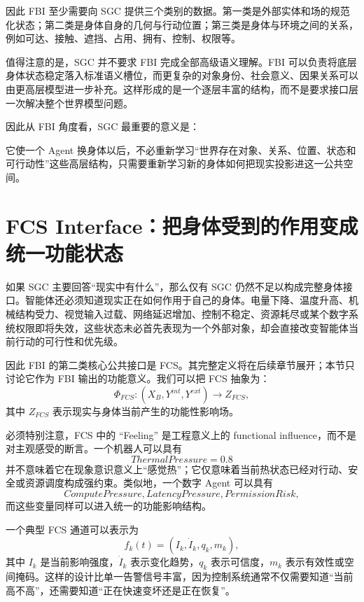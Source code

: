 因此 FBI 至少需要向 SGC 提供三个类别的数据。第一类是外部实体和场的规范化状态；第二类是身体自身的几何与行动位置；第三类是身体与环境之间的关系，例如可达、接触、遮挡、占用、拥有、控制、权限等。

值得注意的是，SGC 并不要求 FBI 完成全部高级语义理解。FBI 可以负责将底层身体状态稳定落入标准语义槽位，而更复杂的对象身份、社会意义、因果关系可以由更高层模型进一步补充。这样形成的是一个逐层丰富的结构，而不是要求接口层一次解决整个世界模型问题。

因此从 FBI 角度看，SGC 最重要的意义是：
\begin{statementbox}
\centering
{}
\end{statementbox}
它使一个 Agent 换身体以后，不必重新学习“世界存在对象、关系、位置、状态和可行动性”这些高层结构，只需要重新学习新的身体如何把现实投影进这一公共空间。


\section{FCS Interface：把身体受到的作用变成统一功能状态}

如果 SGC 主要回答“现实中有什么”，那么仅有 SGC 仍然不足以构成完整身体接口。智能体还必须知道现实正在如何作用于自己的身体。电量下降、温度升高、机械结构受力、视觉输入过载、网络延迟增加、控制不稳定、资源耗尽或某个数字系统权限即将失效，这些状态未必首先表现为一个外部对象，却会直接改变智能体当前行动的可行性和优先级。

因此 FBI 的第二类核心公共接口是 FCS。其完整定义将在后续章节展开；本节只讨论它作为 FBI 输出的功能意义。我们可以把 FCS 抽象为：
\[
\Phi_{FCS}:
(X_B,Y^{int},Y^{ext})
\rightarrow
Z_{FCS},
\]
其中 \(Z_{FCS}\) 表示现实与身体当前产生的功能性影响场。

必须特别注意，FCS 中的 ``Feeling'' 是工程意义上的 functional influence，而不是对主观感受的断言。一个机器人可以具有
\[
ThermalPressure=0.8
\]
并不意味着它在现象意识意义上“感觉热”；它仅意味着当前热状态已经对行动、安全或资源调度构成强约束。类似地，一个数字 Agent 可以具有
\[
ComputePressure,
LatencyPressure,
PermissionRisk,
\]
而这些变量同样可以进入统一的功能影响结构。

一个典型 FCS 通道可以表示为
\[
f_k(t)
=
(
I_k,
\dot I_k,
q_k,
m_k
),
\]
其中 \(I_k\) 是当前影响强度，\(\dot I_k\) 表示变化趋势，\(q_k\) 表示可信度，\(m_k\) 表示有效性或空间掩码。这样的设计比单一告警信号丰富，因为控制系统通常不仅需要知道“当前高不高”，还需要知道“正在快速变坏还是正在恢复”。

